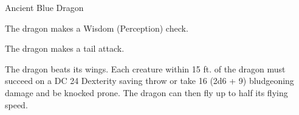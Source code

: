 \begin{monsterbox}{Ancient Blue Dragon}
\begin{monsteraction}
\end{monsteraction}
\begin{monsteraction}[Detect]
The dragon makes a Wisdom (Perception) check.
\end{monsteraction}
\begin{monsteraction}
The dragon makes a tail attack.
\end{monsteraction}
\begin{monsteraction}
The dragon beats its wings. Each creature within 15 ft. of the dragon must succeed on a DC 24 Dexterity saving throw or take 16 (2d6 + 9) bludgeoning damage and be knocked prone. The dragon can then fly up to half its flying speed.
\end{monsteraction}
\end{monsterbox}